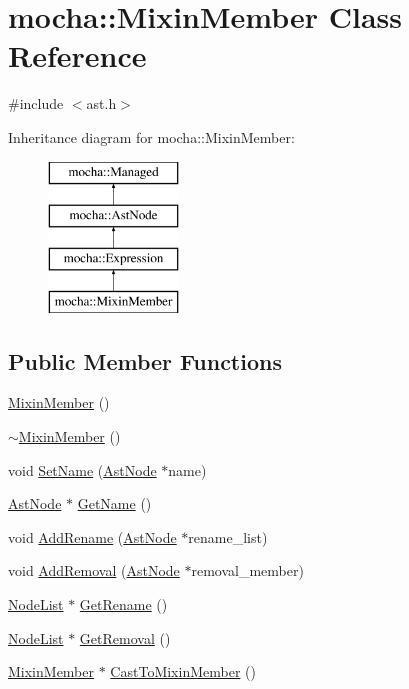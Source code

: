 \hypertarget{classmocha_1_1_mixin_member}{
\section{mocha::MixinMember Class Reference}
\label{classmocha_1_1_mixin_member}
}


{\ttfamily \#include $<$ast.h$>$}

Inheritance diagram for mocha::MixinMember:\begin{figure}[H]
\begin{center}
\leavevmode
\includegraphics[height=4.000000cm]{classmocha_1_1_mixin_member}
\end{center}
\end{figure}
\subsection*{Public Member Functions}
\begin{DoxyCompactItemize}
\item 
\hyperlink{classmocha_1_1_mixin_member_a6284737ae53ede1fa5f26a79408dc21d}{MixinMember} ()
\item 
\hyperlink{classmocha_1_1_mixin_member_ae286919a523a7b707ddffa2a7d145786}{$\sim$MixinMember} ()
\item 
void \hyperlink{classmocha_1_1_mixin_member_af562a89729061523b69e7be493f73943}{SetName} (\hyperlink{classmocha_1_1_ast_node}{AstNode} $\ast$name)
\item 
\hyperlink{classmocha_1_1_ast_node}{AstNode} $\ast$ \hyperlink{classmocha_1_1_mixin_member_aa5d9132bd296c5b85219bb9ade258bdc}{GetName} ()
\item 
void \hyperlink{classmocha_1_1_mixin_member_a40258e778c0f81e7e0c447fba8e9c1a8}{AddRename} (\hyperlink{classmocha_1_1_ast_node}{AstNode} $\ast$rename\_\-list)
\item 
void \hyperlink{classmocha_1_1_mixin_member_a10475970b240e0d58adb28b2c8693674}{AddRemoval} (\hyperlink{classmocha_1_1_ast_node}{AstNode} $\ast$removal\_\-member)
\item 
\hyperlink{classmocha_1_1_node_list}{NodeList} $\ast$ \hyperlink{classmocha_1_1_mixin_member_a03180dc6e537ae2c7d0c92c20acd94be}{GetRename} ()
\item 
\hyperlink{classmocha_1_1_node_list}{NodeList} $\ast$ \hyperlink{classmocha_1_1_mixin_member_a2ccb4af39cf90ada3c94f77c42a301a0}{GetRemoval} ()
\item 
\hyperlink{classmocha_1_1_mixin_member}{MixinMember} $\ast$ \hyperlink{classmocha_1_1_mixin_member_a2a97fa4bd9f23b6bb43b839f0ba264cc}{CastToMixinMember} ()
\end{DoxyCompactItemize}
